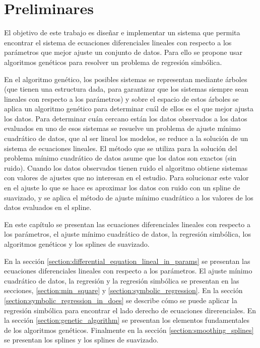\chapter{Preliminares}\label{chapter:preliminaries}

El objetivo de este trabajo es diseñar e implementar un sistema que permita encontrar el sistema de ecuaciones diferenciales lineales con respecto a los parámetros que mejor ajuste un conjunto de datos. Para ello se propone usar algoritmos genéticos para resolver un problema de regresión simbólica.

En el algoritmo genético, los posibles sistemas se representan mediante árboles (que tienen una estructura dada, para garantizar que los sistemas siempre sean lineales con respecto a los parámetros) y sobre el espacio de estos árboles se aplica un algoritmo genético para determinar cuál de ellos es el que mejor ajusta los datos. Para determinar cuán cercano están los datos observados a los datos evaluados en uno de esos sistemas se resuelve un problema de ajuste mínimo cuadrático de datos, que al ser lineal los modelos, se reduce a la solución de un sistema de ecuaciones lineales. El método que se utiliza para la solución del problema mínimo cuadrático de datos asume que los datos son exactos (sin ruido). Cuando los datos observados tienen ruido el algoritmo obtiene sistemas con valores de ajustes que no interesan en el estudio. Para solucionar este valor en el ajuste lo que se hace es aproximar los datos con ruido con un spline de suavizado, y se aplica el método de ajuste mínimo cuadrático a los valores de los datos evaluados en el spline.

En este capítulo se presentan las ecuaciones diferenciales lineales con respecto a los parámetros, el ajuste mínimo cuadrático de datos, la regresión simbólica, los algoritmos genéticos y los splines de suavizado.

En la sección \ref{section:differential_equation_lineal_in_params} se presentan las ecuaciones diferenciales lineales con respecto a los parámetros. El ajuste mínimo cuadrático de datos, la regresión y la regresión simbólica se presentan en las secciones, \ref{section:min_square} y \ref{section:symbolic_regression}. En la sección \ref{section:symbolic_regression_in_does} se describe cómo se puede aplicar la regresión simbólica para encontrar el lado derecho de ecuaciones direrenciales. En la sección \ref{section:genetic_algorithm} se presentan los elementos fundamentales de los algoritmos genéticos. Finalmente en la sección \ref{section:smoothing_splines} se presentan los splines y los splines de suavizado.

